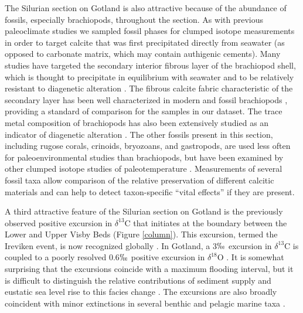 \documentclass[5p, authoryear]{elsarticle}
\begin{document}
The Silurian section on Gotland is also attractive because of the abundance of fossils, especially brachiopods, throughout the section. As with previous paleoclimate studies we sampled fossil phases for clumped isotope measurements in order to target calcite that was first precipitated directly from seawater (as opposed to carbonate matrix, which may contain authigenic cements). Many studies have targeted the secondary interior fibrous layer of the brachiopod shell, which is thought to precipitate in equilibrium with seawater and to be relatively resistant to diagenetic alteration \citep{Azmy1998, Samtleben2001}. The fibrous calcite fabric characteristic of the secondary layer has been well characterized in modern and fossil brachiopods \citep{PerezHuerta2007, Samtleben2001, Schmahl2004}, providing a standard of comparison for the samples in our dataset. The trace metal composition of brachiopods has also been extensively studied as an indicator of diagenetic alteration \citep{Azmy1998, Brand2003, Brand2012, Mii1994, Grossman1996, Shields2003}. The other fossils present in this section, including rugose corals, crinoids, bryozoans, and gastropods, are used less often for paleoenvironmental studies than brachiopods, but have been examined by other clumped isotope studies of paleotemperature \citep{Came2007, Dennis2013, Finnegan2011}. Measurements of several fossil taxa allow comparison of the relative preservation of different calcitic materials and can help to detect taxon-specific ``vital effects'' if they are present. 

A third attractive feature of the Silurian section on Gotland is the previously observed positive excursion in $\delta^{13}$C that initiates at the boundary between the Lower and Upper Visby Beds (Figure \ref{column}). This excursion, termed the Ireviken event, is now recognized globally \citep{Munnecke2003}. In Gotland, a 3$\permil$ excursion in $\delta^{13}$C is coupled to a poorly resolved 0.6$\permil$ positive excursion in $\delta^{18}$O \citep{Munnecke2003}. It is somewhat surprising that the excursions coincide with a maximum flooding interval, but it is difficult to distinguish the relative contributions of sediment supply and eustatic sea level rise to this facies change \citep{Calner2004a}. The excursions are also broadly coincident with minor extinctions in several benthic and pelagic marine taxa \citep{Munnecke2003}. 
\end{document}
